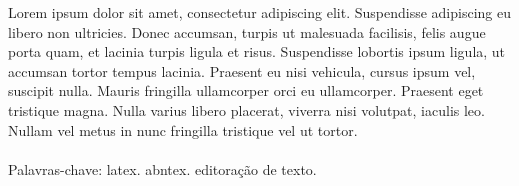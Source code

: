 \begin{resumo}

Lorem ipsum dolor sit amet, consectetur adipiscing elit. Suspendisse adipiscing eu libero non ultricies. Donec accumsan, turpis ut malesuada facilisis, felis augue porta quam, et lacinia turpis ligula et risus. Suspendisse lobortis ipsum ligula, ut accumsan tortor tempus lacinia. Praesent eu nisi vehicula, cursus ipsum vel, suscipit nulla. Mauris fringilla ullamcorper orci eu ullamcorper. Praesent eget tristique magna. Nulla varius libero placerat, viverra nisi volutpat, iaculis leo. Nullam vel metus in nunc fringilla tristique vel ut tortor.
\\\\
\noindent
Palavras-chave: latex. abntex. editoração de texto.

\end{resumo}
